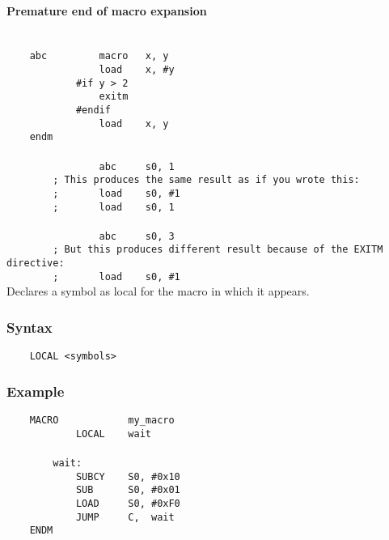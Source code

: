         \paragraph{Premature end of macro expansion}
            ~\\
            \verb'    abc         macro   x, y'\\
            \verb'                load    x, #y'\\
            \verb'            #if y > 2'\\
            \verb'                exitm'\\
            \verb'            #endif'\\
            \verb'                load    x, y'\\
            \verb'    endm'\\
            \verb''\\
            \verb'                abc     s0, 1'\\
            \verb'        ; This produces the same result as if you wrote this:'\\
            \verb'        ;       load    s0, #1'\\
            \verb'        ;       load    s0, 1'\\
            \verb''\\
            \verb'                abc     s0, 3'\\
            \verb'        ; But this produces different result because of the EXITM directive:'\\
            \verb'        ;       load    s0, #1'\\

            Declares a symbol as local for the macro in which it appears.

            \subsubsection{Syntax}
                \verb'    LOCAL <symbols>'

            \subsubsection{Example}
                \verb'    MACRO            my_macro'\\
                \verb'            LOCAL    wait'\\
                \verb''\\
                \verb'        wait:'\\
                \verb'            SUBCY    S0, #0x10'\\
                \verb'            SUB      S0, #0x01' \\
                \verb'            LOAD     S0, #0xF0'\\
                \verb'            JUMP     C,  wait'\\
                \verb'    ENDM'


